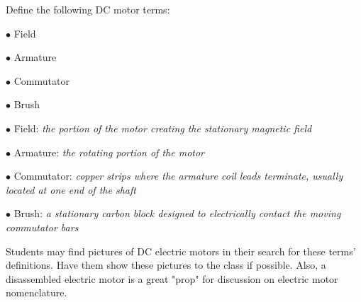 

Define the following DC motor terms:

\medskip
\item{$\bullet$} Field
\item{$\bullet$} Armature
\item{$\bullet$} Commutator
\item{$\bullet$} Brush
\medskip







\medskip
\item{$\bullet$} Field: {\it the portion of the motor creating the stationary magnetic field}
\item{$\bullet$} Armature: {\it the rotating portion of the motor}
\item{$\bullet$} Commutator: {\it copper strips where the armature coil leads terminate, usually located at one end of the shaft}
\item{$\bullet$} Brush: {\it a stationary carbon block designed to electrically contact the moving commutator bars}
\medskip







Students may find pictures of DC electric motors in their search for these terms' definitions.  Have them show these pictures to the class if possible.  Also, a disassembled electric motor is a great "prop" for discussion on electric motor nomenclature.




